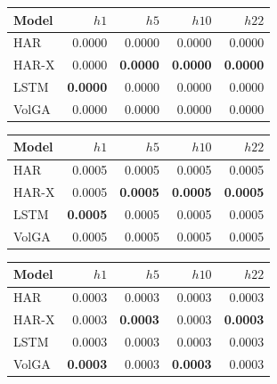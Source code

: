 

\begin{tabular}{lrrrr}
\toprule
Model & $h1$ & $h5$ & $h10$ & $h22$ \\
\midrule
HAR & 0.0000 & 0.0000 & 0.0000 & 0.0000 \\
HAR-X & 0.0000 & \textbf{0.0000} & \textbf{0.0000} & \textbf{0.0000} \\
LSTM & \textbf{0.0000} & 0.0000 & 0.0000 & 0.0000 \\
VolGA & 0.0000 & 0.0000 & 0.0000 & 0.0000 \\
\bottomrule
\end{tabular}

\begin{tabular}{lrrrr}
\toprule
Model & $h1$ & $h5$ & $h10$ & $h22$ \\
\midrule
HAR & 0.0005 & 0.0005 & 0.0005 & 0.0005 \\
HAR-X & 0.0005 & \textbf{0.0005} & \textbf{0.0005} & \textbf{0.0005} \\
LSTM & \textbf{0.0005} & 0.0005 & 0.0005 & 0.0005 \\
VolGA & 0.0005 & 0.0005 & 0.0005 & 0.0005 \\
\bottomrule
\end{tabular}

\begin{tabular}{lrrrr}
\toprule
Model & $h1$ & $h5$ & $h10$ & $h22$ \\
\midrule
HAR & 0.0003 & 0.0003 & 0.0003 & 0.0003 \\
HAR-X & 0.0003 & \textbf{0.0003} & 0.0003 & \textbf{0.0003} \\
LSTM & 0.0003 & 0.0003 & 0.0003 & 0.0003 \\
VolGA & \textbf{0.0003} & 0.0003 & \textbf{0.0003} & 0.0003 \\
\bottomrule
\end{tabular}

